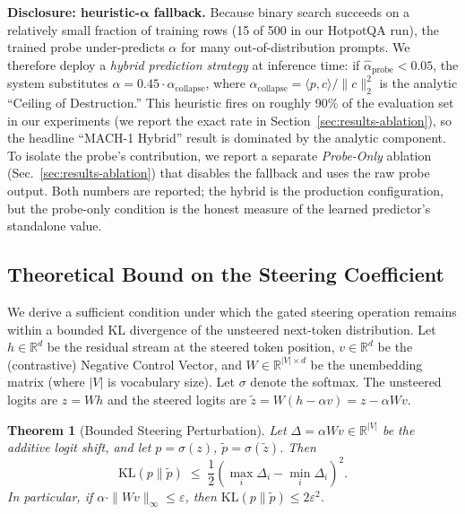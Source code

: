 \documentclass[conference]{IEEEtran}
\newtheorem{theorem}{Theorem}
\begin{document}
\textbf{Disclosure: heuristic-$\boldsymbol\alpha$ fallback.} Because binary search succeeds on a relatively small fraction of training rows (15 of 500 in our HotpotQA run), the trained probe under-predicts $\alpha$ for many out-of-distribution prompts. We therefore deploy a \emph{hybrid prediction strategy} at inference time: if $\hat{\alpha}_{\text{probe}} < 0.05$, the system substitutes $\alpha = 0.45 \cdot \alpha_{\text{collapse}}$, where $\alpha_{\text{collapse}} = \langle p, c\rangle / \|c\|_2^2$ is the analytic ``Ceiling of Destruction.'' This heuristic fires on roughly 90\% of the evaluation set in our experiments (we report the exact rate in Section~\ref{sec:results-ablation}), so the headline ``MACH-1 Hybrid'' result is dominated by the analytic component. To isolate the probe's contribution, we report a separate \emph{Probe-Only} ablation (Sec.~\ref{sec:results-ablation}) that disables the fallback and uses the raw probe output. Both numbers are reported; the hybrid is the production configuration, but the probe-only condition is the honest measure of the learned predictor's standalone value.

\subsection{Theoretical Bound on the Steering Coefficient}\label{sec:method-theorem}

We derive a sufficient condition under which the gated steering operation remains within a bounded KL divergence of the unsteered next-token distribution. Let $h \in \mathbb{R}^d$ be the residual stream at the steered token position, $v \in \mathbb{R}^d$ be the (contrastive) Negative Control Vector, and $W \in \mathbb{R}^{|V| \times d}$ be the unembedding matrix (where $|V|$ is vocabulary size). Let $\sigma$ denote the softmax. The unsteered logits are $z = Wh$ and the steered logits are $\tilde{z} = W(h - \alpha v) = z - \alpha W v$.

\begin{theorem}[Bounded Steering Perturbation]
\label{thm:alpha-bound}
Let $\Delta = \alpha W v \in \mathbb{R}^{|V|}$ be the additive logit shift, and let $p = \sigma(z)$, $\tilde{p} = \sigma(\tilde{z})$. Then
\begin{equation}
    \mathrm{KL}(p \| \tilde{p}) \;\leq\; \frac{1}{2}\left(\max_i \Delta_i - \min_i \Delta_i\right)^2.
    \label{eq:kl-bound}
\end{equation}
In particular, if $\alpha \cdot \|Wv\|_\infty \leq \varepsilon$, then $\mathrm{KL}(p \| \tilde{p}) \leq 2\varepsilon^2$.
\end{theorem}
\end{document}
